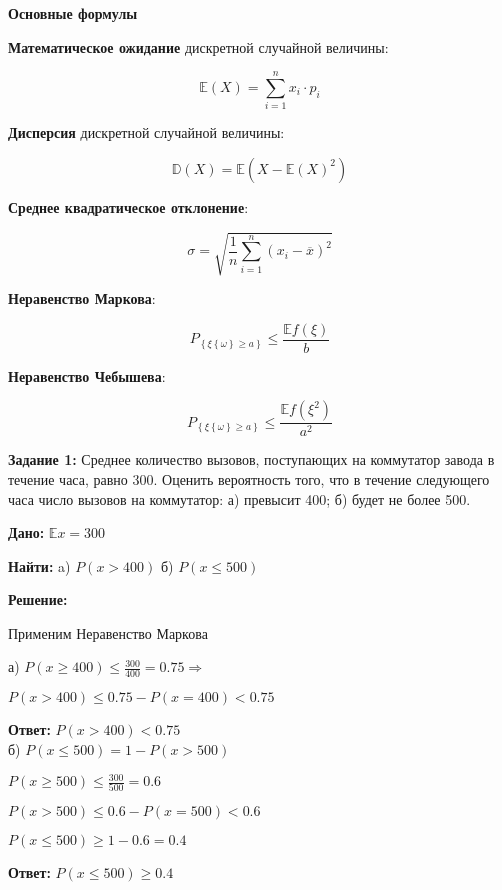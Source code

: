 {}\documentclass{article}
\begin{document}
    \textbf{Основные формулы}

    \textbf{Математическое ожидание} дискретной случайной величины:

    \[
        \mathbb{E}\left(X\right) = \sum_{i=1}^{n} x_i \cdot p_i
    \]

    \textbf{Дисперсия} дискретной случайной величины:

    \[
        \mathbb{D}\left(X\right) = \mathbb{E} \left( X - \mathbb{E}\left( X \right)^2 \right)
    \]

    \textbf{Среднее квадратическое отклонение}:

    \[
        \sigma = \sqrt {\frac{1}{n} \sum_{i=1}^{n} \left( x_i - \overline{x} \right)^2}
    \]

    \textbf{Неравенство Маркова}:

    \[
        P_{\left\{ \xi \left\{ \omega \right\} \geq a \right\}} \leq \frac{\mathbb{E} f\left( \xi \right)}{b}
    \]

    \textbf{Неравенство Чебышева}:

    \[
        P_{\left\{ \xi \left\{ \omega \right\} \geq a \right\}} \leq \frac{\mathbb{E} f\left( \xi^2 \right)}{a^2}
    \]

    \textbf{Задание 1:}
    Среднее количество вызовов, поступающих на коммутатор завода в течение часа, равно 300.
    Оценить вероятность того, что в течение следующего часа число вызовов на коммутатор:
    а) превысит 400;
    б) будет не более 500.

    \textbf{Дано:}
    $\mathbb{E}x = 300$

    \textbf{Найти:}
    a) $P(x > 400)$
    б) $P(x \leq 500)$

    \textbf{Решение:}

    Применим Неравенство Маркова

    а) $P(x \geq 400) \leq \frac{300}{400} = 0.75 \Rightarrow$

    $P(x > 400) \leq 0.75 - P(x = 400) < 0.75$

    \textbf{Ответ:} $P(x > 400) < 0.75$ \\

    б) $P(x \leq 500) = 1 - P(x > 500)$

    $P(x \geq 500) \leq \frac{300}{500} = 0.6$

    $P(x > 500) \leq 0.6 - P(x = 500) < 0.6$

    $P(x \leq 500) \geq 1 - 0.6 = 0.4$

    \textbf{Ответ:} $P(x \leq 500) \geq 0.4$
\end{document}
